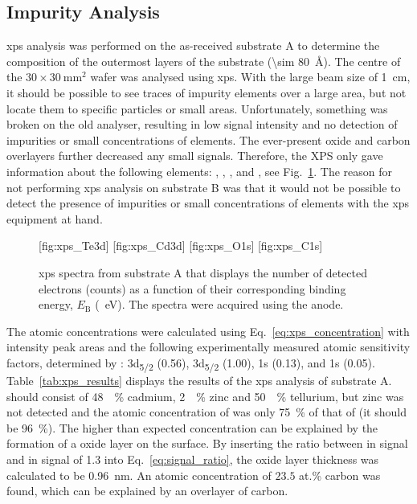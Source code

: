 \subsection{Impurity Analysis}

\Ac{xps} analysis was performed on the as-received substrate A to determine the composition of the outermost layers of the substrate (\SI{\sim 80}{\angstrom}). The centre of the $30\times\SI{30}{\milli\metre^2}$  wafer was analysed using \ac{xps}. With the large beam size of \SI{1}{\centi\metre}, it should be possible to see traces of impurity elements over a large area, but not locate them to specific particles or small areas. Unfortunately, something was broken on the old analyser, resulting in low signal intensity and no detection of impurities or small concentrations of elements. The ever-present oxide and carbon overlayers further decreased any small signals. Therefore, the XPS only gave information about the following elements: , , , and , see Fig.~\ref{fig:xps_spectra}. The reason for not performing \ac{xps} analysis on substrate B was that it would not be possible to detect the presence of impurities or small concentrations of elements with the \ac{xps} equipment at hand.

\begin{figure}[htbp]
    \centering
    [fig:xps_Te3d]
    [fig:xps_Cd3d]
    [fig:xps_O1s]
    [fig:xps_C1s]
    \caption[\Ac{xps} spectra from substrate A.]{\Acf{xps} spectra from substrate A that displays the number of detected electrons (counts) as a function of their corresponding binding energy, $E_\mathrm{B}$ (\SI{}{\electronvolt}). The spectra were acquired using the  anode.}
    \label{fig:xps_spectra}
\end{figure}
 
The atomic concentrations were calculated using Eq.~\eqref{eq:xps_concentration} with intensity peak areas and the following experimentally measured atomic sensitivity factors, determined by \citet{hirsch1999x-ray}:  3d\textsubscript{5/2} (0.56),  3d\textsubscript{5/2} (1.00),  1s (0.13), and  1s (0.05). Table~\ref{tab:xps_results} displays the results of the \ac{xps} analysis of substrate A.  should consist of \SI{48}{\atomic\percent} cadmium, \SI{2}{\atomic\percent} zinc and \SI{50}{\atomic\percent} tellurium, but zinc was not detected and the atomic concentration of  was only \SI{75}{\percent} of that of  (it should be \SI{96}{\percent}). The higher than expected  concentration can be explained by the formation of a  oxide layer on the surface. By inserting the ratio between  in  signal and  in  signal of \SI{1.3}{} into Eq.~\eqref{eq:signal_ratio}, the  oxide layer thickness was calculated to be \SI{0.96}{\nano\metre}. An atomic concentration of $23.5$ at.\% carbon was found, which can be explained by an overlayer of carbon. 


